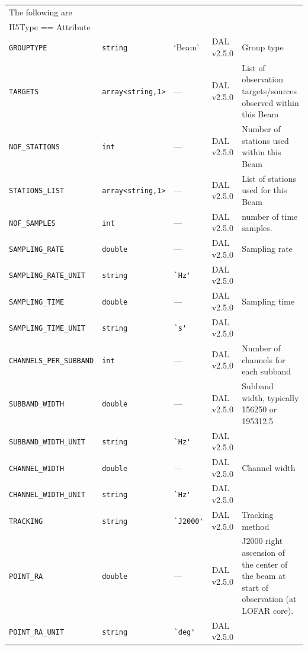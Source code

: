 \documentclass[a4paper,10pt,bibtotoc]{scrartcl}
\begin{document}
\begin{supertabular}{|llllp{5.0cm}|}
  \hline
  \hline 
  \sc The following are & \sc & \sc & \sc   &\\
  \sc H5Type == Attribute & \sc & \sc & \sc   &\\
  \hline 
  \small{\verb|GROUPTYPE|}  & \verb|string| & `Beam' & DAL v2.5.0 & Group type \\
  \small{\verb|TARGETS|}   & \verb|array<string,1>| & --- & DAL v2.5.0 & List of observation
    targets/sources observed within this Beam \\
  \small{\verb|NOF_STATIONS|}  & \verb|int|& --- & DAL v2.5.0 & Number of stations used
    within this Beam \\
  \small{\verb|STATIONS_LIST|}  & \verb|array<string,1>| & --- & DAL v2.5.0 & List of stations used for this Beam \\
    \verb|NOF_SAMPLES|  & \verb|int| & --- & DAL v2.5.0 & number of time samples. \\
    \verb|SAMPLING_RATE|     & \verb|double|  & --- & DAL v2.5.0 & Sampling rate \\
    \verb|SAMPLING_RATE_UNIT|    & \verb|string| & \verb|`Hz'| & DAL v2.5.0 & \\
    \verb|SAMPLING_TIME|   & \verb|double|  & --- & DAL v2.5.0 & Sampling time \\
    \verb|SAMPLING_TIME_UNIT|   & \verb|string| & \verb|`s'| & DAL v2.5.0 & \\
    \verb|CHANNELS_PER_SUBBAND|  & \verb|int|& --- & DAL v2.5.0 & Number of channels for each subband \\
    \verb|SUBBAND_WIDTH|    & \verb|double|  & --- & DAL v2.5.0 & Subband width, typically 156250 or 195312.5 \\
    \verb|SUBBAND_WIDTH_UNIT|   & \verb|string| & \verb|`Hz'| & DAL v2.5.0 & \\
    \verb|CHANNEL_WIDTH|    & \verb|double|  & --- & DAL v2.5.0 & Channel width \\
    \verb|CHANNEL_WIDTH_UNIT|   & \verb|string| & \verb|`Hz'| & DAL v2.5.0 & \\
  \small{\verb|TRACKING|}  & \verb|string| & \verb|`J2000'| & DAL v2.5.0 & Tracking method \\
  \small{\verb|POINT_RA|}  & \verb|double| & --- & DAL v2.5.0 & J2000 right ascension of the center of
  the beam at start of observation (at LOFAR core). \\
  \small{\verb|POINT_RA_UNIT|}  & \verb|string| & \verb|`deg'| & DAL v2.5.0 & \\

\end{supertabular}
\end{document}
